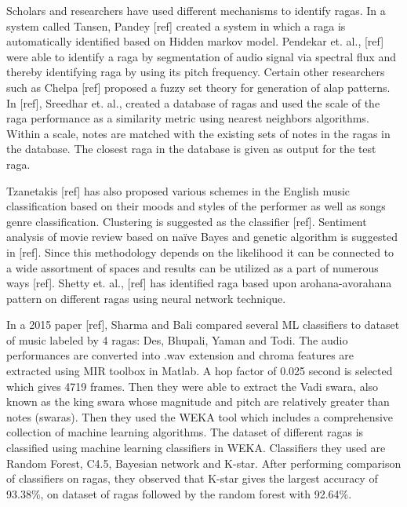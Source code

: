 \doublespacing
\setlength{\parindent}{1cm}

Scholars and researchers have used different mechanisms to identify ragas. In a system called Tansen, Pandey [ref] created a system in which a raga is automatically identified based on Hidden markov model. Pendekar et. al., [ref] were able to identify a raga by segmentation of audio signal via spectral flux and thereby identifying raga by using its pitch frequency. Certain other researchers such as Chelpa [ref] proposed a fuzzy set theory for generation of alap patterns.  In [ref], Sreedhar et. al., created a database of ragas and used the scale of the raga performance as a similarity metric using nearest neighbors algorithms. Within a scale, notes are matched with the existing sets of notes in the ragas in the database. The closest raga in the database is given as output for the test raga.
\par
Tzanetakis [ref] has also proposed various schemes in the English music classification based on their moods and styles of the performer as well as songs genre classification. Clustering is suggested as the classifier [ref]. Sentiment analysis of movie review based on naïve Bayes and genetic algorithm is suggested in [ref]. Since this methodology depends on the likelihood it can be connected to a wide assortment of spaces and results can be utilized as a part of numerous ways [ref]. Shetty et. al., [ref] has identified raga based upon arohana-avorahana pattern on different ragas using neural network technique.
\par
In a 2015 paper [ref], Sharma and Bali compared several ML classifiers to dataset of music labeled by 4 ragas: Des, Bhupali, Yaman and Todi. The audio performances are converted into .wav extension and chroma features are extracted using MIR toolbox in Matlab. A hop factor of 0.025 second is selected which gives 4719 frames. Then they were able to extract the Vadi swara, also known as the king swara whose magnitude and pitch are relatively greater than notes (swaras). Then they used the WEKA tool which includes a comprehensive collection of machine learning algorithms. The dataset of different ragas is classified using machine learning classifiers in WEKA. Classifiers they used are Random Forest, C4.5, Bayesian network and K-star. After performing comparison of classifiers on ragas, they observed that K-star gives the largest accuracy of 93.38\%, on dataset of ragas followed by the random forest with 92.64\%.
\par
